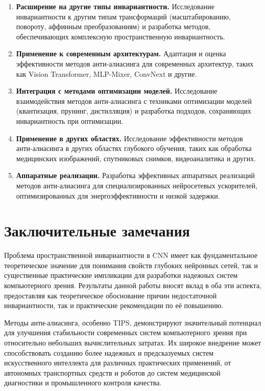 \begin{enumerate}
    \item \textbf{Расширение на другие типы инвариантности.} Исследование инвариантности к другим типам трансформаций (масштабированию, повороту, аффинным преобразованиям) и разработка методов, обеспечивающих комплексную пространственную инвариантность.
    
    \item \textbf{Применение к современным архитектурам.} Адаптация и оценка эффективности методов анти-алиасинга для современных архитектур, таких как Vision Transformer, MLP-Mixer, ConvNext и другие.
    
    \item \textbf{Интеграция с методами оптимизации моделей.} Исследование взаимодействия методов анти-алиасинга с техниками оптимизации моделей (квантизация, прунинг, дистилляция) и разработка подходов, сохраняющих инвариантность при оптимизации.
    
    \item \textbf{Применение в других областях.} Исследование эффективности методов анти-алиасинга в других областях глубокого обучения, таких как обработка медицинских изображений, спутниковых снимков, видеоаналитика и других.
    
    \item \textbf{Аппаратные реализации.} Разработка эффективных аппаратных реализаций методов анти-алиасинга для специализированных нейросетевых ускорителей, оптимизированных для энергоэффективности и низкой задержки.
\end{enumerate}

\section{Заключительные замечания}
\label{conclusion:final}

Проблема пространственной инвариантности в CNN имеет как фундаментальное теоретическое значение для понимания свойств глубоких нейронных сетей, так и существенные практические импликации для разработки надежных систем компьютерного зрения. Результаты данной работы вносят вклад в оба эти аспекта, предоставляя как теоретическое обоснование причин недостаточной инвариантности, так и практические рекомендации по её повышению.

Методы анти-алиасинга, особенно TIPS, демонстрируют значительный потенциал для улучшения стабильности современных систем компьютерного зрения при относительно небольших вычислительных затратах. Их широкое внедрение может способствовать созданию более надежных и предсказуемых систем искусственного интеллекта для различных практических применений, от автономных транспортных средств и роботов до систем медицинской диагностики и промышленного контроля качества.


